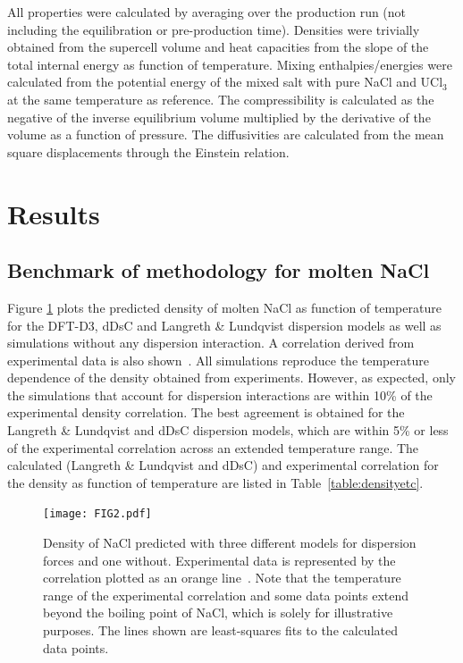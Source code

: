 \documentclass[preprint,3p,10pt,twocolumn,number,sort&compress]{elsarticle}
\begin{document}
All properties were calculated by averaging over the production run (not including the equilibration or pre-production time). Densities were trivially obtained from the supercell volume and heat capacities from the slope of the total internal energy as function of temperature. Mixing enthalpies/energies were calculated from the potential energy of the mixed salt with pure NaCl and UCl$_3$ at the same temperature as reference. The compressibility is calculated as the negative of the inverse equilibrium volume multiplied by the derivative of the volume as a function of pressure. The diffusivities are calculated from the mean square displacements through the Einstein relation. 

\section{Results}
\label{sec:results}
\subsection{Benchmark of methodology for molten NaCl}
Figure \ref{fig:NaCldensity} plots the predicted density of molten NaCl as function of temperature for the DFT-D3, dDsC and Langreth \& Lundqvist dispersion models as well as simulations without any dispersion interaction. A correlation derived from experimental data is also shown~\cite{}. All simulations reproduce the temperature dependence of the density obtained from experiments. However, as expected, only the simulations that account for dispersion interactions are within 10\% of the experimental density correlation. The best agreement is obtained for the Langreth \& Lundqvist and dDsC dispersion models, which are within 5\% or less of the experimental correlation across an extended temperature range. The calculated (Langreth \& Lundqvist  and dDsC) and experimental correlation for the density as function of temperature are listed in Table~\ref{table:densityetc}.


\begin{figure}[htb]
\centering
\texttt{[image: FIG2.pdf]}
\caption{Density of NaCl predicted with three different models for dispersion forces and one without. Experimental data is represented by the correlation plotted as an orange line~\cite{}. Note that the temperature range of the experimental correlation and some data points extend beyond the boiling point of NaCl, which is solely for illustrative purposes. The lines shown are least-squares fits to the calculated data points.} 
\label{fig:NaCldensity}
\end{figure}
\end{document}
